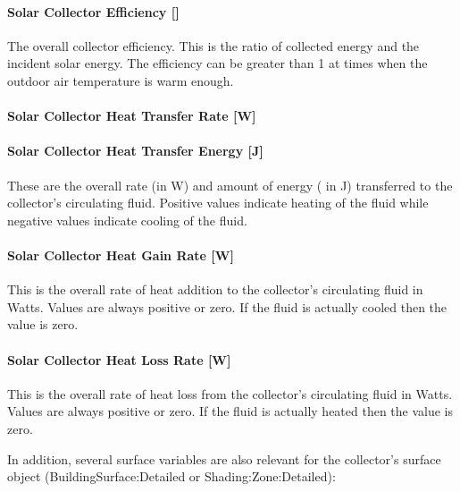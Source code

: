 \paragraph{Solar Collector Efficiency {[]}}\label{solar-collector-efficiency}

The overall collector efficiency. This is the ratio of collected energy and the incident solar energy. The efficiency can be greater than 1 at times when the outdoor air temperature is warm enough.

\paragraph{Solar Collector Heat Transfer Rate {[}W{]}}\label{solar-collector-heat-transfer-rate-w}

\paragraph{Solar Collector Heat Transfer Energy {[}J{]}}\label{solar-collector-heat-transfer-energy-j}

These are the overall rate (in W) and amount of energy ( in J) transferred to the collector's circulating fluid. Positive values indicate heating of the fluid while negative values indicate cooling of the fluid.

\paragraph{Solar Collector Heat Gain Rate {[}W{]}}\label{solar-collector-heat-gain-rate-w}

This is the overall rate of heat addition to the collector's circulating fluid in Watts. Values are always positive or zero. If the fluid is actually cooled then the value is zero.

\paragraph{Solar Collector Heat Loss Rate {[}W{]}}\label{solar-collector-heat-loss-rate-w}

This is the overall rate of heat loss from the collector's circulating fluid in Watts. Values are always positive or zero. If the fluid is actually heated then the value is zero.

In addition, several surface variables are also relevant for the collector's surface object (BuildingSurface:Detailed or Shading:Zone:Detailed):

